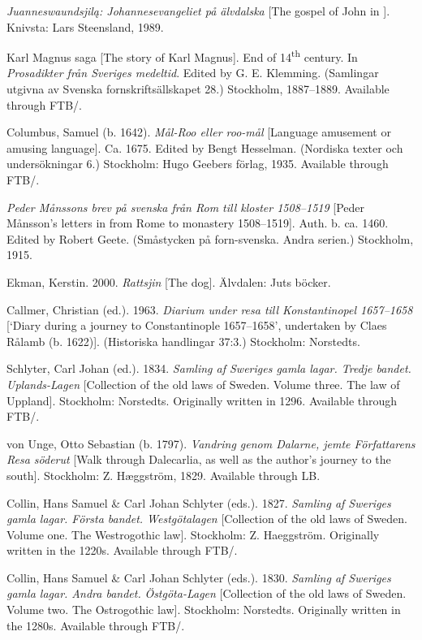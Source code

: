 \documentclass[output=paper]{langscibook}
\begin{document}
\begin{description}[font=\normalfont]
\item[Jua.:] \textit{Juanneswaundsjilą: Johannesevangeliet på älvdalska} [The gospel of John in ]. Knivsta: Lars Steensland, 1989.
\item[KM:] Karl Magnus saga [The story of Karl Magnus]. End of 14\textsuperscript{th} century. In \textit{Prosadikter från Sveriges medeltid}. Edited by G. E. Klemming. (Samlingar utgivna av Svenska fornskriftsällskapet 28.) Stockholm, 1887–1889. Available through FTB\slash {}.
\item[Mål-roo:] Columbus, Samuel (b. 1642). \textit{Mål-Roo eller roo-mål} [Language amusement or amusing language]. Ca. 1675. Edited by Bengt Hesselman. (Nordiska texter och undersökningar 6.) Stockholm: Hugo Geebers förlag, 1935. Available through FTB\slash {}.
\item[Måns:] \textit{Peder Månssons brev på svenska från Rom till  kloster 1508–1519} [Peder Månsson’s letters in  from Rome to  monastery 1508–1519]. Auth. b. ca. 1460. Edited by Robert Geete. (Småstycken på forn-svenska. Andra serien.) Stockholm, 1915.
\item[Rattsjin:] Ekman, Kerstin. 2000. \textit{Rattsjin} [The dog]. Älvdalen: Juts böcker. 
\item[Rålamb:] Callmer, Christian (ed.). 1963. \textit{Diarium under resa till Konstantinopel 1657–1658} [`Diary during a journey to Constantinople 1657–1658’, undertaken by Claes Rålamb (b. 1622)]. (Historiska handlingar 37:3.) Stockholm: Norstedts.
\item[UL:] Schlyter, Carl Johan (ed.). 1834. \emph{Samling af Sweriges gamla lagar. Tredje bandet.} \textit{Uplands-Lagen} [Collection of the old laws of Sweden. Volume three. The law of Uppland]. Stockholm: Norstedts. Originally written in 1296. Available through FTB\slash {}.
\item[von Unge:] von Unge, Otto Sebastian (b. 1797). \textit{Vandring genom Dalarne, jemte Författarens Resa söderut} [Walk through Dalecarlia, as well as the author’s journey to the south]. Stockholm: Z. Hæggström, 1829. Available through LB.
\item[\isi{EWL}:] Collin, Hans Samuel \& Carl Johan Schlyter (eds.). 1827. \emph{Samling af Sweriges gamla lagar. Första bandet. Westgötalagen} [Collection of the old laws of Sweden. Volume one. The Westrogothic law]. Stockholm: Z. Haeggström. Originally written in the 1220s. Available through FTB\slash {}.
\item[ÖgL:] Collin, Hans Samuel \& Carl Johan Schlyter (eds.). 1830. \emph{Samling af Sweriges gamla lagar. Andra bandet.} \textit{Östgöta-Lagen} [Collection of the old laws of Sweden. Volume two. The Ostrogothic law]. Stockholm: Norstedts. Originally written in the 1280s. Available through FTB\slash {}.
\end{description}
\end{document}
